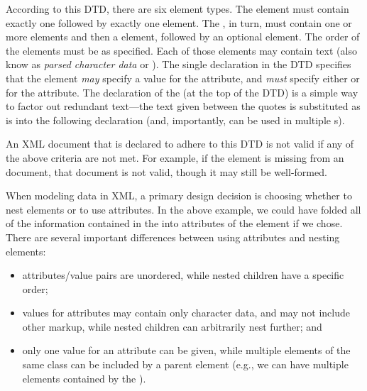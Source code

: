 \documentclass{article}
\begin{document}
\begin{multicols}{2}
According to this DTD, there are six element types. The 
element must contain exactly one  followed by exactly one
 element.  The , in turn, must contain one
or more  elements and then a  element,
followed by an optional  element.  The order of the
elements must be as specified. Each of those
elements may contain text (also know as \emph{parsed character data} or
).  The single  declaration in the
DTD specifies that the  element \emph{may} specify a
value for the  attribute, and \emph{must} specify
either  or  for the 
attribute. The  declaration of the
 (at the top of the DTD) is a simple way to
factor out redundant text---the text given between the quotes is
substituted as is into the following  declaration
(and, importantly, can be used in multiple s).

An XML document that is declared to adhere to this DTD is not valid if
any of the above criteria are not met.  For example, if the
 element is missing from an  document, that
document is not valid, though it may still be well-formed.

When modeling data in XML, a primary design decision is choosing whether
to nest elements or to use attributes.  In the above example, we could
have folded all of the information contained in the  into
attributes of the  element if we chose.  There are
several important differences between using attributes and nesting
elements:

\begin{itemize}

\item attributes/value pairs are unordered, while nested children have a
specific order;

\item values for attributes may contain only character data, and may not
      include other markup, while nested children can arbitrarily nest
      further; and
      
\item only one value for an attribute can be given, while multiple
      elements of the same class can be included by a parent element
      (e.g., we can have multiple  elements contained by
      the ).


\end{itemize}
\end{multicols}
\end{document}
